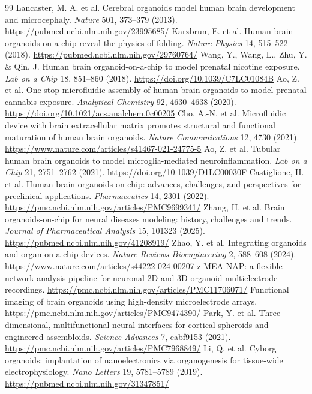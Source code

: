\documentclass[10pt,twocolumn]{article}
\begin{document}
\begin{thebibliography}{99}
 Lancaster, M. A. et al. Cerebral organoids model human brain development and microcephaly. \emph{Nature} 501, 373--379 (2013). \url{https://pubmed.ncbi.nlm.nih.gov/23995685/}
 Karzbrun, E. et al. Human brain organoids on a chip reveal the physics of folding. \emph{Nature Physics} 14, 515--522 (2018). \url{https://pubmed.ncbi.nlm.nih.gov/29760764/}
 Wang, Y., Wang, L., Zhu, Y. \& Qin, J. Human brain organoid-on-a-chip to model prenatal nicotine exposure. \emph{Lab on a Chip} 18, 851--860 (2018). \url{https://doi.org/10.1039/C7LC01084B}
 Ao, Z. et al. One-stop microfluidic assembly of human brain organoids to model prenatal cannabis exposure. \emph{Analytical Chemistry} 92, 4630--4638 (2020). \url{https://doi.org/10.1021/acs.analchem.0c00205}
 Cho, A.-N. et al. Microfluidic device with brain extracellular matrix promotes structural and functional maturation of human brain organoids. \emph{Nature Communications} 12, 4730 (2021). \url{https://www.nature.com/articles/s41467-021-24775-5}
 Ao, Z. et al. Tubular human brain organoids to model microglia-mediated neuroinflammation. \emph{Lab on a Chip} 21, 2751--2762 (2021). \url{https://doi.org/10.1039/D1LC00030F}
 Castiglione, H. et al. Human brain organoids-on-chip: advances, challenges, and perspectives for preclinical applications. \emph{Pharmaceutics} 14, 2301 (2022). \url{https://pmc.ncbi.nlm.nih.gov/articles/PMC9699341/}
 Zhang, H. et al. Brain organoids-on-chip for neural diseases modeling: history, challenges and trends. \emph{Journal of Pharmaceutical Analysis} 15, 101323 (2025). \url{https://pubmed.ncbi.nlm.nih.gov/41208919/}
 Zhao, Y. et al. Integrating organoids and organ-on-a-chip devices. \emph{Nature Reviews Bioengineering} 2, 588--608 (2024). \url{https://www.nature.com/articles/s44222-024-00207-z}
 MEA-NAP: a flexible network analysis pipeline for neuronal 2D and 3D organoid multielectrode recordings. \url{https://pmc.ncbi.nlm.nih.gov/articles/PMC11706071/}
 Functional imaging of brain organoids using high-density microelectrode arrays. \url{https://pmc.ncbi.nlm.nih.gov/articles/PMC9474390/}
 Park, Y. et al. Three-dimensional, multifunctional neural interfaces for cortical spheroids and engineered assembloids. \emph{Science Advances} 7, eabf9153 (2021). \url{https://pmc.ncbi.nlm.nih.gov/articles/PMC7968849/}
 Li, Q. et al. Cyborg organoids: implantation of nanoelectronics via organogenesis for tissue-wide electrophysiology. \emph{Nano Letters} 19, 5781--5789 (2019). \url{https://pubmed.ncbi.nlm.nih.gov/31347851/}

\end{thebibliography}
\end{document}
